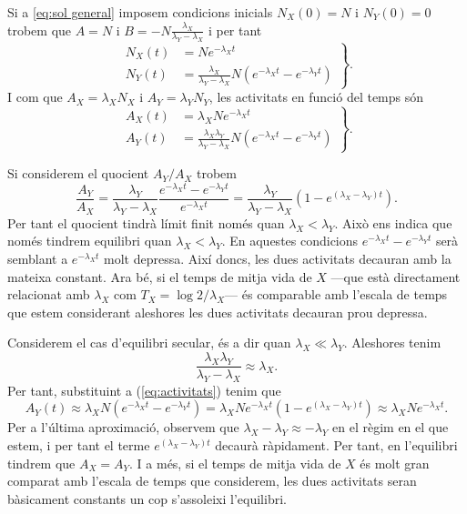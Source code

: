 \documentclass[12pt,a4paper]{article}
\begin{document}
Si a \ref{eq:sol general} imposem condicions inicials \( N_X(0) = N \) i \( N_Y(0) = 0 \) trobem que \( A = N \) i \( B = -N\frac{\lambda_X}{\lambda_Y - \lambda_X} \) i per tant 
\begin{equation*}
	\left.
		\begin{aligned}
			N_X(t) &= Ne^{-\lambda_X t} \\
			N_Y(t) &= \frac{\lambda_X}{\lambda_Y - \lambda_X}N \left(e^{-\lambda_X t} - e^{-\lambda_Y t}\right)
		\end{aligned}
	\right\}.
\end{equation*}
I com que \( A_X = \lambda_X N_X \) i \( A_Y = \lambda_Y N_Y \), les activitats en funció del temps són
\begin{equation} \label{eq:activitats}
	\left.
		\begin{aligned}
			A_X(t) &= \lambda_XNe^{-\lambda_X t} \\
			A_Y(t) &= \frac{\lambda_X \lambda_Y}{\lambda_Y - \lambda_X}N \left(e^{-\lambda_X t} - e^{-\lambda_Y t}\right)
		\end{aligned}
	\right\}.
\end{equation}

Si considerem el quocient \( A_Y / A_X \) trobem
\begin{equation*}
	\frac{A_Y}{A_X} = \frac{\lambda_Y}{\lambda_Y - \lambda_X} \frac{e^{-\lambda_X t} - e^{-\lambda_Y t}}{e^{-\lambda_X t}} = \frac{\lambda_Y}{\lambda_Y - \lambda_X} \left(1 - e^{(\lambda_X - \lambda_Y) t}\right).
\end{equation*}
Per tant el quocient tindrà límit finit només quan \( \lambda_X < \lambda_Y \). Això ens indica que només tindrem equilibri quan \( \lambda_X < \lambda_Y \). En aquestes condicions \( e^{-\lambda_X t} - e^{-\lambda_Y t} \) serà semblant a \( e^{-\lambda_X t}  \) molt depressa. Així doncs, les dues activitats decauran amb la mateixa constant. Ara bé, si el temps de mitja vida de \( X \) ---que està directament relacionat amb \( \lambda_X \) com \( T_X = \log{2}/\lambda_X \)--- és comparable amb l'escala de temps que estem considerant aleshores les dues activitats decauran prou depressa.  

Considerem el cas d'equilibri secular, és a dir quan \( \lambda_X \ll \lambda_Y \). Aleshores tenim 
\begin{equation*}
	\frac{\lambda_X \lambda_Y}{\lambda_Y - \lambda_X} \approx \lambda_X.
\end{equation*}
Per tant, substituint a (\ref{eq:activitats}) tenim que 
\begin{equation*}
	A_Y(t) \approx \lambda_X N \left(e^{-\lambda_X t} - e^{-\lambda_Y t}\right) = \lambda_X N e^{-\lambda_X t} \left(1 - e^{(\lambda_X -\lambda_Y) t}\right) \approx \lambda_X N e^{-\lambda_X t}.
\end{equation*}
Per a l'última aproximació, observem que \( \lambda_X - \lambda_Y \approx -\lambda_Y \) en el règim en el que estem, i per tant el terme \( e^{(\lambda_X - \lambda_Y) t} \) decaurà ràpidament. Per tant, en l'equilibri tindrem que \( A_X = A_Y \). I a més, si el temps de mitja vida de \( X \) és molt gran comparat amb l'escala de temps que considerem, les dues activitats seran bàsicament constants un cop s'assoleixi l'equilibri.
\end{document}
